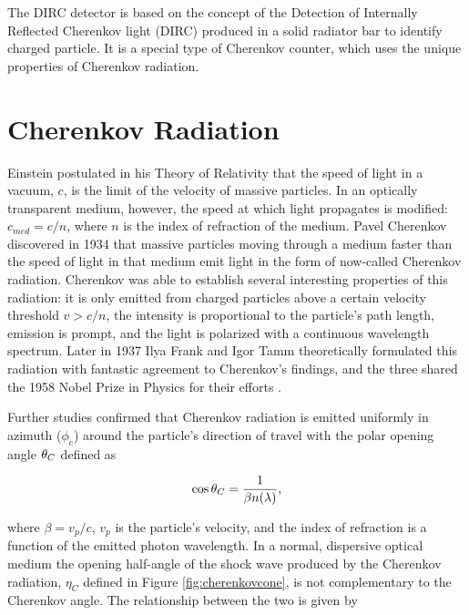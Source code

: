 \label{ch:dirc}
The DIRC detector is based on the concept of the Detection of Internally Reflected Cherenkov light (DIRC) produced in a solid radiator bar to identify charged particle. It is a special type of Cherenkov counter, which uses the unique properties of Cherenkov radiation.

\section{Cherenkov Radiation}
Einstein postulated in his Theory of Relativity that the speed of light in a vacuum, $c$, is the limit of the velocity of massive particles. In an optically transparent medium, however, the speed at which light propagates is modified: $c_{med} = c/n$, where $n$ is the index of refraction of the medium. Pavel Cherenkov discovered in 1934 that massive particles moving through a medium faster than the speed of light in that medium emit light in the form of now-called Cherenkov radiation. Cherenkov was able to establish several interesting properties of this radiation: it is only emitted from charged particles above a certain velocity threshold $v > c/n$, the intensity is proportional to the particle's path length, emission is prompt, and the light is polarized with a continuous wavelength spectrum. Later in 1937 Ilya Frank and Igor Tamm theoretically formulated this radiation with fantastic agreement to Cherenkov's findings, and the three shared the 1958 Nobel Prize in Physics for their efforts \cite{CherenkovHistory}.

Further studies confirmed that Cherenkov radiation is emitted uniformly in azimuth ($\phi_c$) around the particle's direction of travel with the polar opening angle $\theta_{C}$ defined as

\begin{equation}
	\cos\theta_{C} = \frac{1}{\beta n(\lambda)},
	\label{eq:cherenkovformula}
\end{equation}

where $\beta = v_p/c$, $v_p$ is the particle's velocity, and the index of refraction is a function of the emitted photon wavelength. In a normal, dispersive optical medium the opening half-angle of the shock wave produced by the Cherenkov radiation, $\eta_C$ defined in Figure \ref{fig:cherenkovcone}, is not complementary to the Cherenkov angle. The relationship between the two is given by

